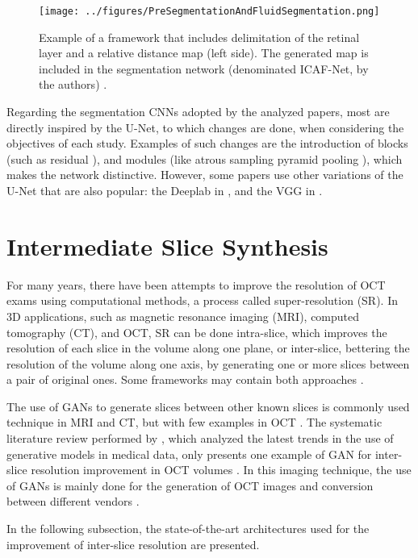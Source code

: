 \par
\begin{figure}[!ht]
	\centering
	\texttt{[image: ../figures/PreSegmentationAndFluidSegmentation.png]}
	\caption{Example of a framework that includes delimitation of the retinal layer and a relative distance map (left side). The generated map is included in the segmentation network (denominated ICAF-Net, by the authors) \cite{Tang2022}.}
	\label{fig:PreSegmentationAndFluidSegmentation}
\end{figure}
\par
Regarding the segmentation CNNs adopted by the analyzed papers, most are directly inspired by the U-Net, to which changes are done, when considering the objectives of each study. Examples of such changes are the introduction of blocks (such as residual \parencite{Mantel2021, Zhang2023, Liu2024, Hassan2021b, Hassan2021a, Padilla2022}), and modules (like atrous sampling pyramid pooling \parencite{Hassan2021b, Hassan2021a, Hu2019, Sappa2021}), which makes the network distinctive. However, some papers use other variations of the U-Net that are also popular: the Deeplab \parencite{LChen2018} in \textcite{Hassan2021a, Li2023}, and the VGG \parencite{Simonyan2014} in \textcite{Padilla2022, Hassan2021b}.

\section{Intermediate Slice Synthesis}
For many years, there have been attempts to improve the resolution of OCT exams using computational methods, a process called super-resolution (SR). In 3D applications, such as magnetic resonance imaging (MRI), computed tomography (CT), and OCT, SR can be done intra-slice, which improves the resolution of each slice in the volume along one plane, or inter-slice, bettering the resolution of the volume along one axis, by generating one or more slices between a pair of original ones. Some frameworks may contain both approaches \parencite{You2020}.
\par
The use of GANs to generate slices between other known slices is commonly used technique in MRI and CT, but with few examples in OCT \parencite{You2020}. The systematic literature review performed by \textcite{Ibrahim2024}, which analyzed the latest trends in the use of generative models in medical data, only presents one example of GAN for inter-slice resolution improvement in OCT volumes \parencite{Lopez2023}. In this imaging technique, the use of GANs is mainly done for the generation of OCT images and conversion between different vendors \parencite{Ibrahim2024}.
\par
In the following subsection, the state-of-the-art architectures used for the improvement of inter-slice resolution are presented.

